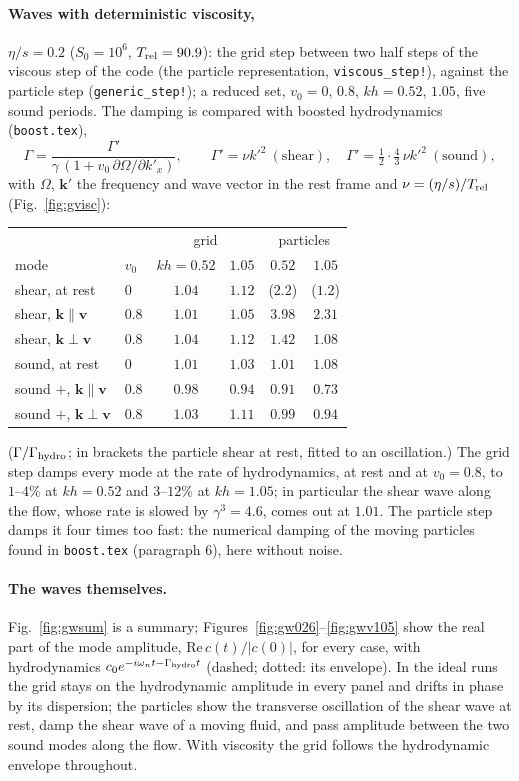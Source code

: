 \documentclass[11pt,aps,preprint,nofootinbib,superscriptaddress,tightenlines]{revtex4-2}
\def\st{\begin{equation}}
\def\stp{\end{equation}}
\def\Fig#1{Fig.~\ref{#1}}
\let\oldparagraph\paragraph
\renewcommand{\paragraph}{\par\bigskip\oldparagraph}
\begin{document}
\paragraph{Waves with deterministic viscosity,} $\eta/s=0.2$ ($S_0=10^6$, $T_{\rm rel}=90.9$): the grid step between two
half steps of the viscous step of the code (the particle representation, \texttt{viscous\_step!}),
against the particle step (\texttt{generic\_step!}); a reduced set, $v_0=0$, $0.8$, $kh=0.52$, $1.05$, five
sound periods.  The damping is compared with boosted hydrodynamics (\texttt{boost.tex}),
\st
\Gamma=\frac{\Gamma'}{\gamma\,(1+v_0\,\partial\Omega/\partial k'_x)},\qquad \Gamma'=\nu k'^2\ (\text{shear}),\quad
\Gamma'=\tfrac12\cdot\tfrac43\,\nu k'^2\ (\text{sound}),
\stp
with $\Omega$, $\bm k'$ the frequency and wave vector in the rest frame and $\nu=(\eta/s)/T_{\rm rel}$
(\Fig{fig:gvisc}):
\begin{center}
\begin{tabular}{llcccc}
\hline
 & & \multicolumn{2}{c}{grid} & \multicolumn{2}{c}{particles} \\
mode & $v_0$ & $kh=0.52$ & $1.05$ & $0.52$ & $1.05$ \\ \hline
shear, at rest & 0 & $1.04$ & $1.12$ & ($2.2$) & ($1.2$) \\
shear, $\bm k\parallel\bm v$ & 0.8 & $1.01$ & $1.05$ & $3.98$ & $2.31$ \\
shear, $\bm k\perp\bm v$ & 0.8 & $1.04$ & $1.12$ & $1.42$ & $1.08$ \\
sound, at rest & 0 & $1.01$ & $1.03$ & $1.01$ & $1.08$ \\
sound $+$, $\bm k\parallel\bm v$ & 0.8 & $0.98$ & $0.94$ & $0.91$ & $0.73$ \\
sound $+$, $\bm k\perp\bm v$ & 0.8 & $1.03$ & $1.11$ & $0.99$ & $0.94$ \\
\hline
\end{tabular}
\end{center}
($\Gamma/\Gamma_{\rm hydro}$; in brackets the particle shear at rest, fitted to an oscillation.)  The grid step
damps every mode at the rate of hydrodynamics, at rest and at $v_0=0.8$, to $1$--$4\%$ at $kh=0.52$
and $3$--$12\%$ at $kh=1.05$; in particular the shear wave along the flow, whose rate is slowed by
$\gamma^3=4.6$, comes out at $1.01$.  The particle step damps it four times too fast: the numerical
damping of the moving particles found in \texttt{boost.tex} (paragraph 6), here without noise.

\paragraph{The waves themselves.}  \Fig{fig:gwsum} is a summary; Figures~\ref{fig:gw026}--\ref{fig:gwv105} show the real part of the
mode amplitude, $\mathrm{Re}\,c(t)/|c(0)|$, for every case, with hydrodynamics
$c_0e^{-i\omega_nt-\Gamma_{\rm hydro}t}$ (dashed; dotted: its envelope).  In the ideal runs the grid stays on
the hydrodynamic amplitude in every panel and drifts in phase by its dispersion; the particles show
the transverse oscillation of the shear wave at rest, damp the shear wave of a moving fluid, and
pass amplitude between the two sound modes along the flow.  With viscosity the grid follows the
hydrodynamic envelope throughout.
\end{document}
